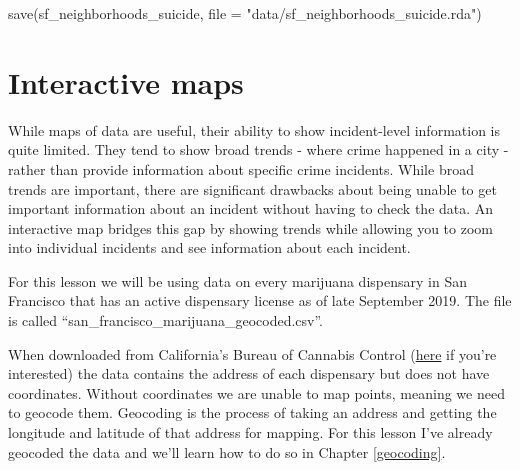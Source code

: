 \documentclass[
  12pt,
  openany]{book}
\newenvironment{Shaded}{\begin{snugshade}}{\end{snugshade}}
\newcommand{\AttributeTok}[1]{\textcolor[rgb]{0.61,0.61,0.61}{#1}}
\newcommand{\FunctionTok}[1]{\textcolor[rgb]{0,0,0}{#1}}
\newcommand{\NormalTok}[1]{#1}
\newcommand{\StringTok}[1]{\textcolor[rgb]{0.5,0.5,0.5}{#1}}
\begin{document}
\begin{Shaded}
\begin{Highlighting}[]
\FunctionTok{save}\NormalTok{(sf\_neighborhoods\_suicide, }\AttributeTok{file =} \StringTok{"data/sf\_neighborhoods\_suicide.rda"}\NormalTok{)}
\end{Highlighting}
\end{Shaded}

\hypertarget{interactive-maps}{%
\chapter{Interactive maps}\label{interactive-maps}}

While maps of data are useful, their ability to show incident-level information is quite limited. They tend to show broad trends - where crime happened in a city - rather than provide information about specific crime incidents. While broad trends are important, there are significant drawbacks about being unable to get important information about an incident without having to check the data. An interactive map bridges this gap by showing trends while allowing you to zoom into individual incidents and see information about each incident.

For this lesson we will be using data on every marijuana dispensary in San Francisco that has an active dispensary license as of late September 2019. The file is called ``san\_francisco\_marijuana\_geocoded.csv''.

When downloaded from California's Bureau of Cannabis Control (\href{https://aca5.accela.com/bcc/customization/bcc/cap/licenseSearch.aspx}{here} if you're interested) the data contains the address of each dispensary but does not have coordinates. Without coordinates we are unable to map points, meaning we need to
geocode them. Geocoding is the process of taking an address and getting the longitude and latitude of that address for mapping. For this lesson I've already geocoded the data and we'll learn how to do so in Chapter \ref{geocoding}.
\end{document}
